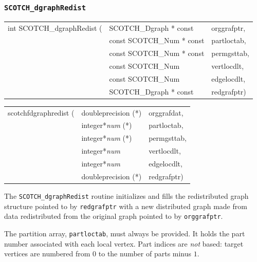 \subsubsection{{\tt SCOTCH\_dgraphRedist}}
\label{sec-lib-dgraphredist}

\begin{itemize}
\progsyn

{\tt\begin{tabular}{l@{}ll}

int SCOTCH\_dgraphRedist ( & SCOTCH\_Dgraph * const    & orggrafptr, \\
                           & const SCOTCH\_Num * const & partloctab, \\
                           & const SCOTCH\_Num * const & permgsttab, \\
                           & const SCOTCH\_Num         & vertlocdlt, \\
                           & const SCOTCH\_Num         & edgelocdlt, \\
                           & SCOTCH\_Dgraph * const    & redgrafptr)
\end{tabular}}

{\tt\begin{tabular}{l@{}ll}
scotchfdgraphredist ( & doubleprecision (*)   & orggrafdat, \\
                      & integer*{\it num} (*) & partloctab, \\
                      & integer*{\it num} (*) & permgsttab, \\
                      & integer*{\it num}     & vertlocdlt, \\
                      & integer*{\it num}     & edgelocdlt, \\
                      & doubleprecision (*)   & redgrafptr)
\end{tabular}}

\progdes

The {\tt SCOTCH\_dgraphRedist} routine initializes and fills the
redistributed graph structure pointed to by
{\tt red\lbt graf\lbt ptr} with a new distributed graph
made from data redistributed from the original
graph pointed to by {\tt org\lbt graf\lbt ptr}.

The partition array, {\tt part\lbt loc\lbt tab}, must always be
provided. It holds the part number associated with each local
vertex. Part indices are {\em not\/} based: target vertices are
numbered from $0$ to the number of parts minus $1$.


\end{itemize}
